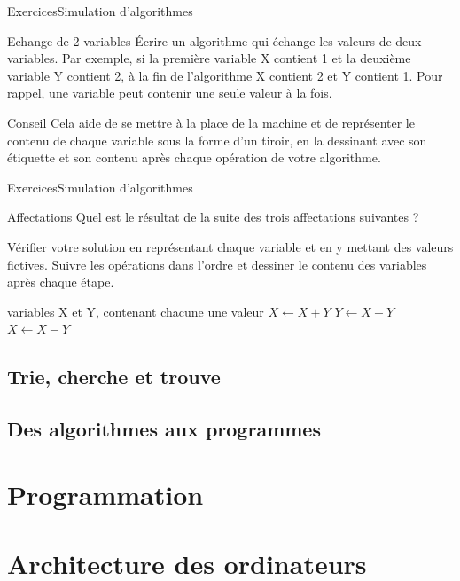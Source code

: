 \documentclass{beamer}
\begin{document}
\begin{frame}{Exercices}{Simulation d'algorithmes}
	\begin{alertblock}{Echange de 2 variables}
		Écrire un algorithme qui échange les valeurs de deux variables. Par exemple, si la première variable X contient 1 et la deuxième variable Y contient 2, à la fin de l’algorithme X contient 2 et Y contient 1. Pour rappel, une variable peut contenir une seule valeur à la fois.
	\end{alertblock}
	\begin{exampleblock}{Conseil}
		Cela aide de se mettre à la place de la machine et de représenter le contenu de chaque variable sous la forme d’un tiroir, en la dessinant avec son étiquette et son contenu après chaque opération de votre algorithme.
	\end{exampleblock}
\end{frame}

\begin{frame}{Exercices}{Simulation d'algorithmes}
	\begin{alertblock}{Affectations}
		Quel est le résultat de la suite des trois affectations suivantes ?

		Vérifier votre solution en représentant chaque variable et en y mettant des valeurs fictives. Suivre les opérations dans l’ordre et dessiner le contenu des variables après chaque étape.
		\begin{algorithmic}[1]
			 variables X et Y, contenant chacune une valeur
			\STATE $X \gets X+Y$
			\STATE $Y \gets X-Y$
			\STATE $X \gets X-Y$
		\end{algorithmic}
	\end{alertblock}
\end{frame}

\lecture{}{}

\subsection{Trie, cherche et trouve}

\subsection{Des algorithmes aux programmes}

\section{Programmation}
\section{Architecture des ordinateurs}
\end{document}

